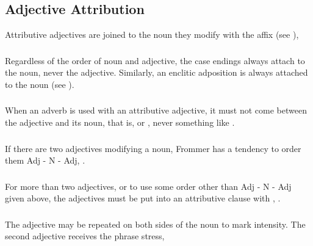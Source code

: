 \subsection{Adjective Attribution} Attributive adjectives are joined
to the noun they modify with the affix  (see
),     \label{syn:adj:attr}

\subsubsection{} Regardless of the order of noun and adjective, the
case endings always attach to the noun, never the adjective.
Similarly, an enclitic adposition is always attached to the noun
(see ).

\subsubsection{} When an adverb is used with an attributive adjective,
it must not come between the adjective and its noun, that is,
  or
, never something like .

\subsubsection{} If there are two adjectives modifying a noun, Frommer
has a tendency to order them Adj - N - Adj,  .

\subsubsection{} For more than two adjectives, or to use some order
other than  Adj - N - Adj given above, the adjectives must be put
into an attributive clause with , 
.

\subsubsection{} The adjective may be repeated on both sides of the
noun to mark intensity.  The second adjective receives the phrase
stress,  

